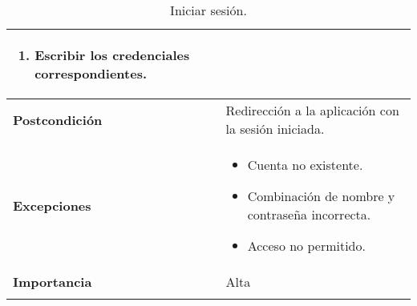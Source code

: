 \begin{longtable}[H]{@{}l|l@{}}
\begin{minipage}[t]{0.71\columnwidth}
\begin{enumerate}
			\item Escribir los credenciales correspondientes.
		\end{enumerate}
	\end{minipage}\tabularnewline
	\midrule
	\begin{minipage}[t]{0.23\columnwidth}\raggedright\strut
		\textbf{Postcondición}\strut
	\end{minipage} & \begin{minipage}[t]{0.71\columnwidth}\raggedright\strut
		Redirección a la aplicación con la sesión iniciada.\strut
	\end{minipage}\tabularnewline
	\midrule
	\begin{minipage}[t]{0.23\columnwidth}\raggedright\strut
		\textbf{Excepciones}\strut
	\end{minipage} & \begin{minipage}[t]{0.71\columnwidth}\raggedright\strut
		\begin{itemize}
			\tightlist
			\item Cuenta no existente.
			\item Combinación de nombre y contraseña incorrecta.
			\item Acceso no permitido.
		\end{itemize}
	\end{minipage}\tabularnewline
	\midrule
	\begin{minipage}[t]{0.23\columnwidth}\raggedright\strut
		\textbf{Importancia}\strut
	\end{minipage} & \begin{minipage}[t]{0.71\columnwidth}\raggedright\strut
		Alta\strut
	\end{minipage}\tabularnewline
	\bottomrule
	\caption{Iniciar sesión.}
	\label{cu:1}
\end{longtable}
\newpage


